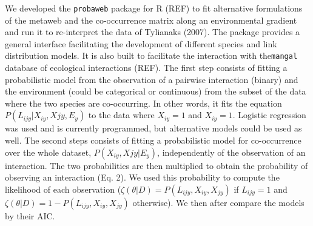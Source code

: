 





We developed the \texttt{probaweb} package for R (REF) to fit
alternative formulations of the metaweb and the co-occurrence matrix
along an environmental gradient and run it to re-interpret the data of
Tylianaks (2007). The package provides a general interface facilitating
the development of different species and link distribution models. It is
also built to facilitate the interaction with the\texttt{mangal} database
of ecological interactions (REF). The first step consists of fitting a
probabilistic model from the observation of a pairwise interaction (binary)
and the environment (could be categorical or continuous) from the subset of
the data where the two species are co-occurring. In other words, it fits
the equation $P(L_{ijy}|X_{iy},X{jy},E_y)$ to the data where $X_{iy} = 1$
and $X_{iy} = 1$. Logistic regression was used and is currently programmed,
but alternative models could be used as well. The second steps consists of
fitting a probabilistic model for co-occurrence over the whole dataset,
$P(X_{iy},X{jy}|E_y)$, independently of the observation of an interaction. The
two probabilities are then multiplied to obtain the probability of observing
an interaction (Eq. 2). We used this probability to compute the likelihood of
each observation ($\zeta(\theta|D) = P(L_{ijy},X_{iy},X_{jy})$ if $L_{ijy}=1$
and $\zeta(\theta|D) = 1 - P(L_{ijy},X_{iy},X_{jy})$ otherwise). We then
after compare the models by their AIC.







